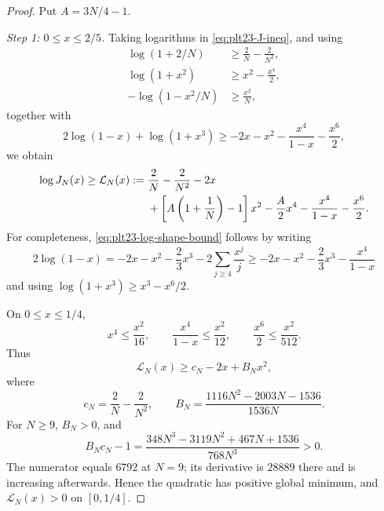 \documentclass[11pt]{article}
\numberwithin{equation}{section}
\begin{document}
\begin{proof}
  Put $A=3N/4-1$.

  \smallskip
  \noindent\emph{Step 1: $0\le x\le2/5$.}
  Taking logarithms in \eqref{eq:plt23-J-ineq}, and using
  \begin{align*}
    \log(1+2/N)&\ge\frac{2}{N}-\frac{2}{N^2},\\
    \log(1+x^2)&\ge x^2-\frac{x^4}{2},\\
    -\log(1-x^2/N)&\ge\frac{x^2}{N},
  \end{align*}
  together with
  \begin{equation}\label{eq:plt23-log-shape-bound}
    2\log(1-x)+\log(1+x^3)
    \ge-2x-x^2-\frac{x^4}{1-x}-\frac{x^6}{2},
  \end{equation}
  we obtain
  \begin{align}
    \log J_N(x)\ge\mathcal L_N(x):={}&
    \frac{2}{N}-\frac{2}{N^2}-2x \notag\\
    &+\left[A\left(1+\frac{1}{N}\right)-1\right]x^2
    -\frac {A}{2}x^4-\frac{x^4}{1-x}-\frac{x^6}{2}. \label{eq:plt23-L-N-def}
  \end{align}
  For completeness, \eqref{eq:plt23-log-shape-bound} follows by writing
  \[
    2\log(1-x)
    =-2x-x^2-\frac{2}{3}x^3-2\sum_{j\ge4}\frac{x^j}{j}
    \ge-2x-x^2-\frac{2}{3}x^3-\frac{x^4}{1-x}
  \]
  and using $\log(1+x^3)\ge x^3-x^6/2$.

  On $0\le x\le1/4$,
  \[
    x^4\le\frac{x^2}{16},
    \qquad
    \frac{x^4}{1-x}\le\frac{x^2}{12},
    \qquad
    \frac{x^6}{2}\le\frac{x^2}{512}.
  \]
  Thus
  \[
    \mathcal L_N(x)\ge c_N-2x+B_Nx^2,
  \]
  where
  \[
    c_N=\frac{2}{N}-\frac{2}{N^2},
    \qquad
    B_N=\frac{1116N^2-2003N-1536}{1536N}.
  \]
  For $N\ge9$, $B_N>0$, and
  \begin{equation}\label{eq:plt23-discriminant-check}
    B_Nc_N-1
    =\frac{348N^3-3119N^2+467N+1536}{768N^3}>0.
  \end{equation}
  The numerator equals $6792$ at $N=9$; its derivative is $28889$
  there and is increasing afterwards.  Hence the quadratic has positive global
  minimum, and $\mathcal L_N(x)>0$ on $[0,1/4]$.


\end{proof}
\end{document}
